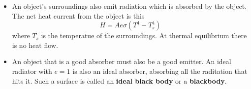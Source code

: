 \documentclass{article}
\begin{document}
\begin{itemize}
  \item An object's surroundings also emit radiation which is absorbed by the object. The net heat current from the object is this \[H = A e \sigma (T^4 - T_s^4)\] where $T_s$ is the temperatue of the surroundings. At thermal equilibrium there is no heat flow.

  \item An object that is a good absorber must also be a good emitter. An ideal radiator with $e = 1$ is also an ideal absorber, absorbing all the raditation that hits it. Such a surface is called an \textbf{ideal black body} or a \textbf{blackbody}.
\end{itemize}
\end{document}
